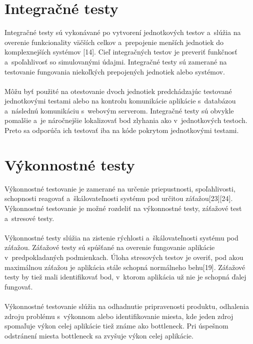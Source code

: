 \documentclass[
  digital, %
  table,   %
oneside,
  nolof,     %
  nolot,     %
]{fithesis3}
\begin{document}
\section{Integračné testy}
Integračné testy sú vykonávané po vytvorení jednotkových testov a~slúžia na overenie funkcionality väčších celkov a~prepojenie menších jednotiek do komplexnejších systémov [14]. Cieľ integračných testov je preveriť funkčnosť a~spoľahlivosť so simulovanými údajmi. Integračné testy sú zamerané na testovanie fungovania niekoľkých prepojených jednotiek alebo systémov.\paragraph{}
Môžu byť použité na otestovanie dvoch jednotiek predchádzajúc testované jednotkovými testami alebo na kontrolu komunikácie aplikácie s~databázou a~následnú komunikáciu s~webovým serverom.  Integračné testy sú obvykle pomalšie a~je náročnejšie lokalizovať bod zlyhania ako v~jednotkových  testoch. Preto sa odporúča ich testovať iba na kóde pokrytom jednotkovými testami.
\section{Výkonnostné testy}
Výkonnostné testovanie je zamerané na určenie priepustnosti, spoľahlivosti, schopnosti reagovať a~škálovateľnosti systému pod určitou záťažou[23][24]. Výkonnostné testovanie je možné rozdeliť na výkonnostné testy, záťažové test a~stresové testy.\paragraph{}
Výkonnostné testy slúžia na zistenie rýchlosti a~škálovateľnosti systému pod záťažou. Záťažové testy sú spúšťané na overenie fungovanie aplikácie v~predpokladaných podmienkach. Úloha stresových  testov je overiť, pod akou maximálnou záťažou je aplikácia stále schopná normálneho behu[19]. Záťažové testy by tiež mali identifikovať bod, v~ktorom aplikácia už nie je schopná ďalej fungovať.\paragraph{}
Výkonnostné testovanie slúžia na odhadnutie pripravenosti produktu, odhalenia zdroju problému s~výkonnom alebo  identifikovanie miesta, kde jeden zdroj spomaľuje výkon celej aplikácie tiež známe ako bottleneck. Pri úspešnom odstránení miesta bottleneck sa zvyšuje výkon celej aplikácie.
\end{document}
